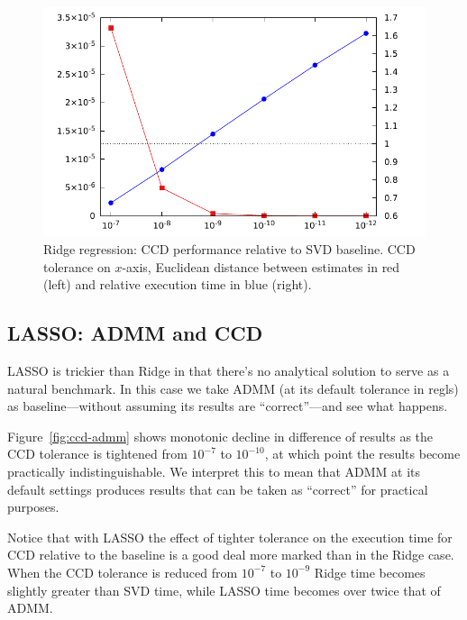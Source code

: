 \documentclass{article}
\begin{document}
\begin{figure}[htbp]
\begin{center}
\includegraphics[scale=0.9]{ccd_svd.pdf}
\caption{Ridge regression: CCD performance relative to SVD
  baseline. CCD tolerance on $x$-axis, Euclidean distance between
  estimates in red (left) and relative execution time in blue
  (right).}
\label{fig:ccd-svd}
\end{center}
\end{figure}

\subsection{LASSO: ADMM and CCD}

LASSO is trickier than Ridge in that there's no analytical solution to
serve as a natural benchmark. In this case we take ADMM (at its
default tolerance in \textsf{regls}) as baseline---without assuming
its results are ``correct''---and see what happens.

Figure~\ref{fig:ccd-admm} shows monotonic decline in difference of
results as the CCD tolerance is tightened from $10^{-7}$ to
$10^{-10}$, at which point the results become practically
indistinguishable. We interpret this to mean that ADMM at its default
settings produces results that can be taken as ``correct'' for
practical purposes.

Notice that with LASSO the effect of tighter tolerance on the
execution time for CCD relative to the baseline is a good deal more
marked than in the Ridge case. When the CCD tolerance is reduced from
$10^{-7}$ to $10^{-9}$ Ridge time becomes slightly greater than SVD
time, while LASSO time becomes over twice that of ADMM.
\end{document}
